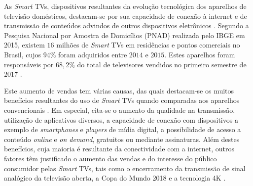
As \emph{Smart} TVs, dispositivos resultantes da evolução tecnológica dos aparelhos de televisão domésticos, destacam-se por sua capacidade de conexão à internet e de transmissão de conteúdos advindos de outros dispositivos eletrônicos \cite{samsung:smarttv,perakakis2015proposed}.
Segundo a Pesquisa Nacional por Amostra de Domicílios (PNAD) realizada pelo IBGE em 2015, existem $16$ milhões de \emph{Smart} TVs em residências e pontos comerciais no Brasil, cujos $94\%$ foram adquiridos entre $2014$ e $2015$. Estes aparelhos foram responsáveis por $68,2\%$ do total de televisores vendidos no primeiro semestre de $2017$ \cite{pnad2015}.



Este aumento de vendas tem várias causas, das quais destacam-se os muitos benefícios resultantes do uso de \emph{Smart} TVs quando comparadas aos aparelhos convencionais \cite{shin2013smart,differencebetween}. Em especial, cita-se o aumento da qualidade na transmissão, utilização de aplicativos diversos, a capacidade de conexão com dispositivos a exemplo de \emph{smartphones} e \emph{players} de mídia digital, a possibilidade de acesso a conteúdo \emph{online} e \emph{on demand}, gratuitos ou mediante assinaturas. Além destes benefícios, cuja maioria é resultante da conectividade com a internet, outros fatores têm justificado o aumento das vendas e do interesse do público consumidor pelas \emph{Smart} TVs, tais como o encerramento da transmissão de sinal analógico da televisão aberta, a Copa do Mundo 2018 e a tecnologia 4K \cite{leiajabuscasmart,correiopnad,estadao:explosaovideosonline}.


